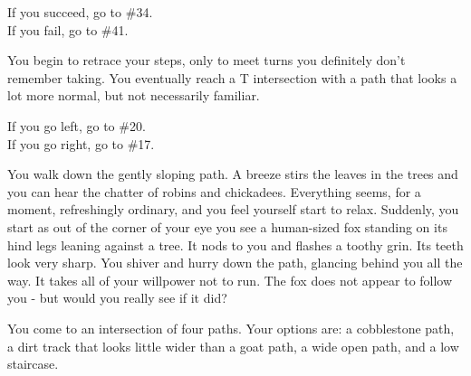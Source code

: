 \documentclass[green]{gl2018}
\begin{document}
\begin{LARGE}
\begin{location}{8}
\begin{fromhere}
If you succeed, go to \#34.\\
  If you fail, go to \#41.
\end{fromhere}
\end{location}
\begin{location}{9}
You begin to retrace your steps, only to meet turns you definitely don't remember taking. You eventually reach a T intersection with a path that looks a lot more normal, but not necessarily familiar.
\begin{fromhere}
 If you go left, go to \#20.\\
 If you go right, go to \#17.
\end{fromhere}
\end{location}
\begin{location}{10}
You walk down the gently sloping path.  A breeze stirs the leaves in the trees and you can hear the chatter of robins and chickadees.  Everything seems, for a moment, refreshingly ordinary, and you feel yourself start to relax.  Suddenly, you start as out of the corner of your eye you see a human-sized fox standing on its hind legs leaning against a tree.  It nods to you and flashes a toothy grin.  Its teeth look very sharp.  You shiver and hurry down the path, glancing behind you all the way.  It takes all of your willpower not to run.  The fox does not appear to follow you - but would you really see if it did?

You come to an intersection of four paths.  Your options are: a cobblestone path, a dirt track that looks little wider than a goat path, a wide open path, and a low staircase.  


\end{location}
\end{LARGE}
\end{document}
